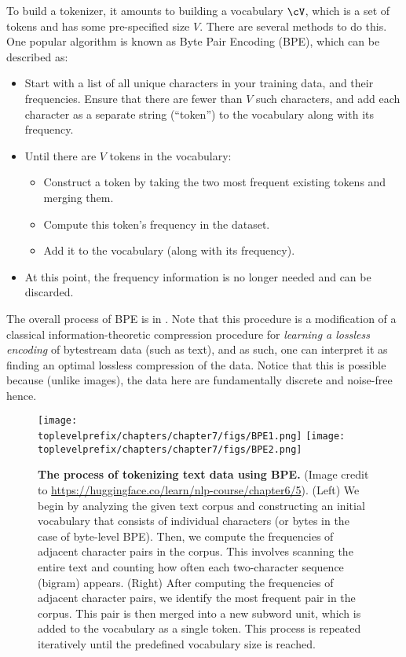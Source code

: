 \documentclass[../../book-main.tex]{subfiles}
\begin{document}
To build a tokenizer, it amounts to building a vocabulary \(\cV\), which is a set of tokens and has some pre-specified size \(V\). There are several methods to do this. One popular algorithm is known as Byte Pair Encoding (BPE), which can be described as:
\begin{itemize}
    \item Start with a list of all unique characters in your training data, and their frequencies. Ensure that there are fewer than \(V\) such characters, and add each character as a separate string (``token'') to the vocabulary along with its frequency.
    \item Until there are \(V\) tokens in the vocabulary:
    \begin{itemize}
        \item Construct a token by taking the two most frequent existing tokens and merging them.
        \item Compute this token's frequency in the dataset.
        \item Add it to the vocabulary (along with its frequency).
    \end{itemize} 
    \item At this point, the frequency information is no longer needed and can be discarded.
\end{itemize}
The overall process of BPE is in . Note that this procedure is a modification of a classical information-theoretic compression procedure for \textit{learning a lossless encoding} of bytestream data (such as text), and as such, one can interpret it as finding an optimal lossless compression of the data. Notice that this is possible because (unlike images), the data here are fundamentally discrete and noise-free hence.
\begin{figure}
    \centering
    \texttt{[image: \\toplevelprefix/chapters/chapter7/figs/BPE1.png]}\hspace{0.6in} 
    \texttt{[image: \\toplevelprefix/chapters/chapter7/figs/BPE2.png]} 
    \caption{\small {\bf The process of tokenizing text data using BPE.} (Image credit to \url{https://huggingface.co/learn/nlp-course/chapter6/5}). (Left) We begin by analyzing the given text corpus and constructing an initial vocabulary that consists of individual characters (or bytes in the case of byte-level BPE). Then, we compute the frequencies of adjacent character pairs in the corpus. This involves scanning the entire text and counting how often each two-character sequence (bigram) appears. (Right) After computing the frequencies of adjacent character pairs, we identify the most frequent pair in the corpus. This pair is then merged into a new subword unit, which is added to the vocabulary as a single token. This process is repeated iteratively until the predefined vocabulary size is reached. }
    \label{fig:BPE}
\end{figure}
\end{document}
